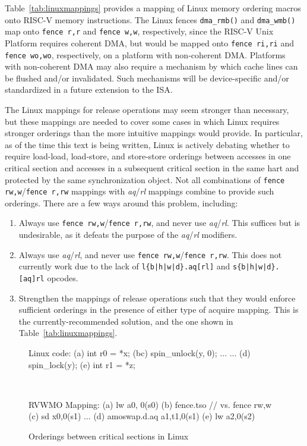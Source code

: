 Table~\ref{tab:linuxmappings} provides a mapping of Linux memory ordering macros onto RISC-V memory instructions.
The Linux fences {\tt dma\_rmb()} and {\tt dma\_wmb()} map onto {\tt fence r,r} and {\tt fence w,w}, respectively, since the RISC-V Unix Platform requires coherent DMA, but would be mapped onto {\tt fence ri,ri} and {\tt fence wo,wo}, respectively, on a platform with non-coherent DMA.
Platforms with non-coherent DMA may also require a mechanism by which cache lines can be flushed and/or invalidated.
Such mechanisms will be device-specific and/or standardized in a future extension to the ISA.

The Linux mappings for release operations may seem stronger than necessary, but these mappings are needed to cover some cases in which Linux requires stronger orderings than the more intuitive mappings would provide.
In particular, as of the time this text is being written, Linux is actively debating whether to require load-load, load-store, and store-store orderings between accesses in one critical section and accesses in a subsequent critical section in the same hart and protected by the same synchronization object.
Not all combinations of {\tt fence rw,w}/{\tt fence r,rw} mappings with {\em aq}/{\em rl} mappings combine to provide such orderings.
There are a few ways around this problem, including:
\begin{enumerate}
  \item Always use {\tt fence rw,w}/{\tt fence r,rw}, and never use {\em aq}/{\em rl}.  This suffices but is undesirable, as it defeats the purpose of the {\em aq}/{\em rl} modifiers.
  \item Always use {\em aq}/{\em rl}, and never use {\tt fence rw,w}/{\tt fence r,rw}.  This does not currently work due to the lack of {\tt l\{b|h|w|d\}.aq[rl]} and {\tt s\{b|h|w|d\}.[aq]rl} opcodes.
  \item Strengthen the mappings of release operations such that they would enforce sufficient orderings in the presence of either type of acquire mapping.  This is the currently-recommended solution, and the one shown in Table~\ref{tab:linuxmappings}.
\end{enumerate}

\begin{figure}[h!]
  \centering\small
  \begin{verbbox}
Linux code:
(a)  int r0 = *x;
(bc) spin_unlock(y, 0);
     ...
     ...
(d)  spin_lock(y);
(e)  int r1 = *z;
  \end{verbbox}
  \theverbbox
  ~~~~~~~~~~
  \begin{verbbox}
RVWMO Mapping:
(a) lw           a0, 0(s0)
(b) fence.tso  // vs. fence rw,w
(c) sd           x0,0(s1)
    ...
(d) amoswap.d.aq a1,t1,0(s1)
(e) lw           a2,0(s2)
  \end{verbbox}
  \theverbbox
  \caption{Orderings between critical sections in Linux}
  \label{fig:litmus:lkmm_ll}
\end{figure}

